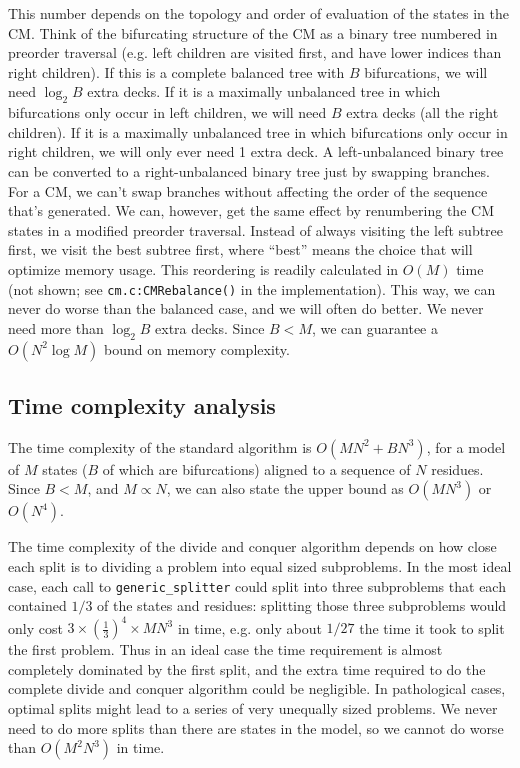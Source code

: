 \documentclass[11pt]{article}
\begin{document}
This number depends on the topology and order of evaluation of the
states in the CM. Think of the bifurcating structure of the CM as a
binary tree numbered in preorder traversal (e.g. left children are
visited first, and have lower indices than right children). If this is
a complete balanced tree with $B$ bifurcations, we will need $\log_2
B$ extra decks. If it is a maximally unbalanced tree in which
bifurcations only occur in left children, we will need $B$ extra decks
(all the right children). If it is a maximally unbalanced tree in
which bifurcations only occur in right children, we will only ever
need 1 extra deck. A left-unbalanced binary tree can be converted to a
right-unbalanced binary tree just by swapping branches. For a CM, we
can't swap branches without affecting the order of the sequence that's
generated. We can, however, get the same effect by renumbering the CM
states in a modified preorder traversal. Instead of always visiting
the left subtree first, we visit the best subtree first, where
``best'' means the choice that will optimize memory usage.  This
reordering is readily calculated in $O(M)$ time (not shown; see
\texttt{cm.c:CMRebalance()} in the implementation).  This way, we can
never do worse than the balanced case, and we will often do better. We
never need more than $\log_2 B$ extra decks. Since $B < M$, we can
guarantee a $O(N^2 \log M)$ bound on memory complexity.

\subsection{Time complexity analysis}

The time complexity of the standard algorithm is $O(MN^2 + BN^3)$, for
a model of $M$ states ($B$ of which are bifurcations) aligned to a
sequence of $N$ residues. Since $B < M$, and $M \propto N$, we can
also state the upper bound as $O(MN^3)$ or $O(N^4)$.

The time complexity of the divide and conquer algorithm depends on how
close each split is to dividing a problem into equal sized
subproblems. In the most ideal case, each call to
\texttt{generic\_splitter} could split into three subproblems that
each contained $1/3$ of the states and residues: splitting those three
subproblems would only cost $3 \times (\frac{1}{3})^4 \times MN^3$ in
time, e.g. only about $1/27$ the time it took to split the first
problem. Thus in an ideal case the time requirement is almost
completely dominated by the first split, and the extra time required
to do the complete divide and conquer algorithm could be
negligible. In pathological cases, optimal splits might lead to a
series of very unequally sized problems. We never need to do more splits
than there are states in the model, so we cannot do worse than
$O(M^2N^3)$ in time.
\end{document}
